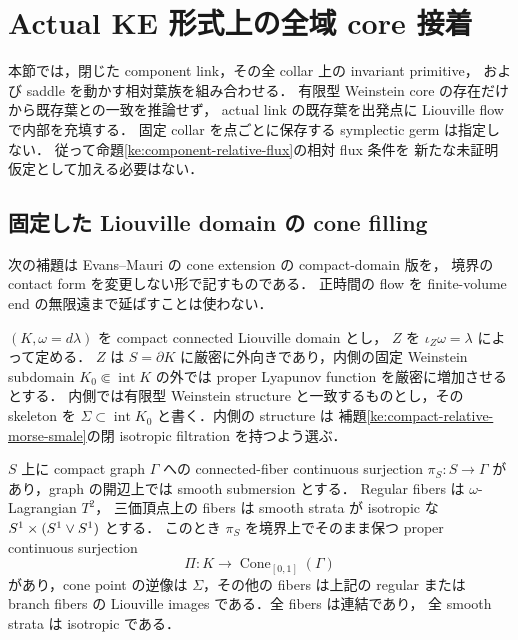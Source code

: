 \section{Actual KE 形式上の全域 core 接着}
\label{ke:actual-core-gluing-section}

本節では，閉じた component link，その全 collar 上の invariant primitive，
および saddle を動かす相対葉族を組み合わせる．
有限型 Weinstein core の存在だけから既存葉との一致を推論せず，
actual link の既存葉を出発点に Liouville flow で内部を充填する．
固定 collar を点ごとに保存する symplectic germ は指定しない．
従って命題\ref{ke:component-relative-flux}の相対 flux 条件を
新たな未証明仮定として加える必要はない．

\subsection{固定した Liouville domain の cone filling}

次の補題は Evans--Mauri の cone extension
\cite[Lemma~2.16 and Remark~2.18]{EM}の compact-domain 版を，
境界の contact form を変更しない形で記すものである．
正時間の flow を finite-volume end の無限遠まで延ばすことは使わない．

\begin{lemma}
\label{ke:actual-link-cone-filling}
$(K,\omega=d\lambda)$ を compact connected Liouville domain とし，
$Z$ を $\iota_Z\omega=\lambda$ によって定める．
$Z$ は $S=\partial K$ に厳密に外向きであり，内側の固定 Weinstein subdomain
$K_0\Subset\operatorname{int}K$ の外では proper Lyapunov function を厳密に増加させるとする．
内側では有限型 Weinstein structure と一致するものとし，その skeleton を
$\Sigma\subset\operatorname{int}K_0$ と書く．内側の structure は
補題\ref{ke:compact-relative-morse-smale}の閉 isotropic filtration を持つよう選ぶ．

$S$ 上に compact graph $\Gamma$ への connected-fiber continuous surjection
$\pi_S:S\to\Gamma$ があり，graph の開辺上では smooth submersion とする．
Regular fibers は $\omega$-Lagrangian $T^2$，
三価頂点上の fibers は smooth strata が isotropic な $S^1\times(S^1\vee S^1)$ とする．
このとき $\pi_S$ を境界上でそのまま保つ proper continuous surjection
\[
 \Pi:K\longrightarrow\operatorname{Cone}_{[0,1]}(\Gamma)
\]
があり，cone point の逆像は $\Sigma$，その他の fibers は上記の regular または
branch fibers の Liouville images である．全 fibers は連結であり，
全 smooth strata は isotropic である．
\end{lemma}

